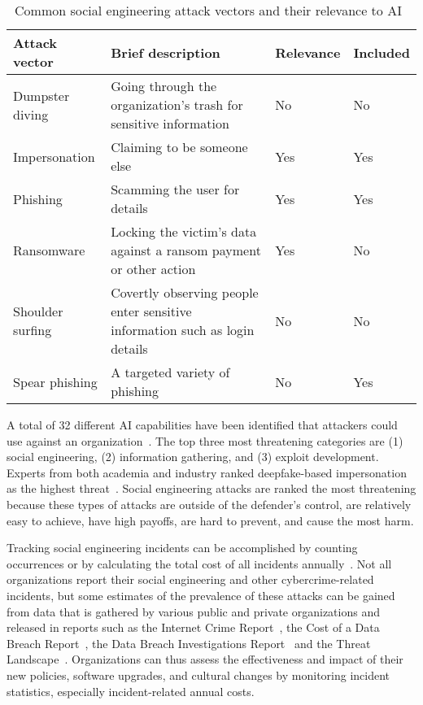 \begin{table}[h!]  
\centering  
\renewcommand{\arraystretch}{1.5} %
\setlength{\tabcolsep}{5pt} %
\begin{tabularx}{\textwidth}{|l|X|l|l|} %
\hline  
\textbf{Attack vector} & \textbf{Brief description} & \textbf{Relevance} & \textbf{Included} \\ \hline  
Dumpster diving & Going through the organization's trash for sensitive information & No & No \\ \hline  
Impersonation & Claiming to be someone else & Yes & Yes \\ \hline  
Phishing & Scamming the user for details & Yes & Yes \\ \hline  
Ransomware & Locking the victim's data against a ransom payment or other action & Yes & No \\ \hline  
Shoulder surfing & Covertly observing people enter sensitive information such as login details & No & No \\ \hline  
Spear phishing & A targeted variety of phishing & No & Yes \\ \hline  
\end{tabularx}  
\caption{Common social engineering attack vectors and their relevance to AI~\citep{mirsky_Threat_Offensive_AI_Organizations_2023}}  
\label{table:attacks}  
\end{table} 

%
%
A total of 32 different AI capabilities have been identified that attackers could use against an organization~\citep{mirsky_Threat_Offensive_AI_Organizations_2023}. The top three most threatening categories are (1) social engineering, (2) information gathering, and (3) exploit development. Experts from both academia and industry ranked deepfake-based impersonation as the highest threat~\citep{mirsky_Threat_Offensive_AI_Organizations_2023}. Social engineering attacks are ranked the most threatening because these types of attacks are outside of the defender's control, are relatively easy to achieve, have high payoffs, are hard to prevent, and cause the most harm.



%
%
Tracking social engineering incidents can be accomplished by counting occurrences or by calculating the total cost of all incidents annually~\citep{ibm_Cost_Data_Breach_Report_2024}. Not all organizations report their social engineering and other cybercrime-related incidents, but some estimates of the prevalence of these attacks can be gained from data that is gathered by various public and private organizations and released in reports such as the Internet Crime Report~\citep{fbi_Internet_Crime_Report_2023}, the Cost of a Data Breach Report~\citep{ibm_Cost_Data_Breach_Report_2024}, the Data Breach Investigations Report~\citep{verizon_Data_Breach_Investigations_Report_2024} and the Threat Landscape~\citep{eniza_Threat_Landscape_2024}. Organizations can thus assess the effectiveness and impact of their new policies, software upgrades, and cultural changes by monitoring incident statistics, especially incident-related annual costs.




